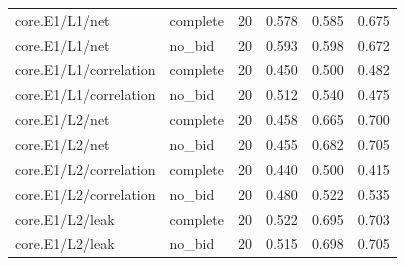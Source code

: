 \begin{longtable}{@{}p{2.2in}lrrrr@{}}
core.\allowbreak E1/\allowbreak L1/\allowbreak net & complete & 20 & 0.578 & 0.585 & 0.675\\
core.\allowbreak E1/\allowbreak L1/\allowbreak net & no\_\allowbreak bid & 20 & 0.593 & 0.598 & 0.672\\
core.\allowbreak E1/\allowbreak L1/\allowbreak correlation & complete & 20 & 0.450 & 0.500 & 0.482\\
core.\allowbreak E1/\allowbreak L1/\allowbreak correlation & no\_\allowbreak bid & 20 & 0.512 & 0.540 & 0.475\\
core.\allowbreak E1/\allowbreak L2/\allowbreak net & complete & 20 & 0.458 & 0.665 & 0.700\\
core.\allowbreak E1/\allowbreak L2/\allowbreak net & no\_\allowbreak bid & 20 & 0.455 & 0.682 & 0.705\\
core.\allowbreak E1/\allowbreak L2/\allowbreak correlation & complete & 20 & 0.440 & 0.500 & 0.415\\
core.\allowbreak E1/\allowbreak L2/\allowbreak correlation & no\_\allowbreak bid & 20 & 0.480 & 0.522 & 0.535\\
core.\allowbreak E1/\allowbreak L2/\allowbreak leak & complete & 20 & 0.522 & 0.695 & 0.703\\
core.\allowbreak E1/\allowbreak L2/\allowbreak leak & no\_\allowbreak bid & 20 & 0.515 & 0.698 & 0.705\\

\end{longtable}
